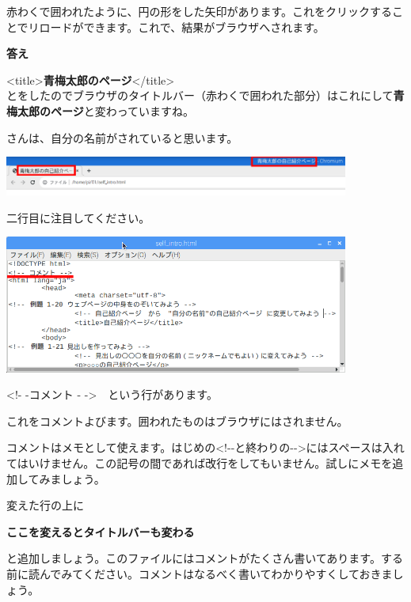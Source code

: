 \flushleft
赤わくで囲われたように、円の形をした矢印があります。これをクリックすることでリロードができます。これで、結果がブラウザへされます。

\vfill
\clearpage


\textbf{答え}


{\textless}title{\textgreater}\textbf{青梅太郎のページ}{\textless}/title{\textgreater}\\
とをしたのでブラウザのタイトルバー（赤わくで囲われた部分）はこれにして\textbf{青梅太郎のページ}と変わっていますね。

さんは、自分の名前がされていると思います。

\centering
\includegraphics[width=0.85\textwidth]{text01-img/textbook-img152.png}
\flushleft


二行目に注目してください。

\centering
\includegraphics[width=0.85\textwidth]{text01-img/textbook-img151.png}
\flushleft



\bigskip

{\textless}!- -コメント -
-{\textgreater}　という行があります。

これをコメントよびます。囲われたものはブラウザにはされません。

コメントはメモとして使えます。はじめの{\textless}!-{}-と終わりの{}-{}-{\textgreater}にはスペースは入れてはいけません。この記号の間であれば改行をしてもいません。試しにメモを追加してみましょう。

変えた行の上に

\textbf{ここを変えるとタイトルバーも変わる
}

と追加しましょう。このファイルにはコメントがたくさん書いてあります。する前に読んでみてください。コメントはなるべく書いてわかりやすくしておきましょう。


